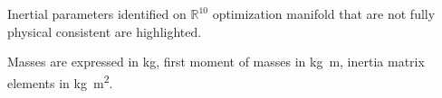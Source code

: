 \begin{table*}[ht]
Inertial parameters identified on $\mathbb{R}^{10}$ optimization manifold that are not fully physical consistent are highlighted.

Masses are expressed in \si{kg}, first moment of masses in \si{kg.m}, inertia matrix elements in \si{kg.m^2}.
\end{table*}